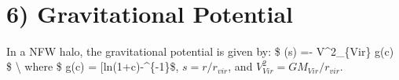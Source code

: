\documentclass[11pt]{article}
\begin{document}
    \begin{center}
    \end{center}
    { \hspace*{\fill} \\}
    
    \section{6) Gravitational Potential}\label{gravitational-potential}

    In a NFW halo, the gravitational potential is given by: \$ \Phi (s) =-
V\^{}2\_\{Vir\} g(c)  \$ \textbackslash{} where \$
g(c) = {[}ln(1+c)-\frac{c}{1+c}{]}\^{}\{-1\}\$, \(s = r/r_{vir}\), and
\(V^2_{Vir} = GM_{Vir}/r_{vir}\).


    
    
    
    
\end{document}
